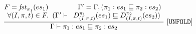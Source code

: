 \begin{gather*}
\frac{ \begin{matrix}
\text{\codeme{F = \m{fst}_{\pure{\pi_1}}(\es_1)\qquad\qquad \Gamma^\prime = \Gamma,  (
\pure{\pi_1} : \es_1 \CONTAIN \pure{\pi_2} : \es_2
)} }\\
    \text{\codeme{\forall (I, \pi, t)\in F. \   (\Gamma^\prime  \vdash \   D_{(I, \pi, t)}^{\pure{\pi_1}}( \es_1) \CONTAIN    D_{(I, \pi, t)}^{\pure{\pi_2}}( \es_2) )}}
  \end{matrix}}
   { \text{\codeme{  \Gamma  \vdash \pure{\pi_1} : \es_1 \CONTAIN \pure{\pi_2} : \es_2 }}}\  \codeme{[UNFOLD]} 
\end{gather*}